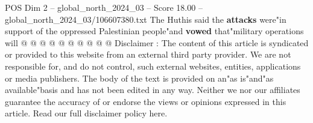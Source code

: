 \begin{textsample}{POS Dim 2 – global\_north\_2024\_03 – Score 18.00 – global\_north\_2024\_03/106607380.txt}
The Huthis said the \textbf{attacks} were"in support of the oppressed Palestinian people"and \textbf{vowed} that"military operations will @ @ @ @ @ @ @ @ @ @ Disclaimer : The content of this article is syndicated or provided to this website from an external third party provider.
We are not responsible for, and do not control, such external websites, entities, applications or media publishers.
The body of the text is provided on an"as is"and"as available"basis and has not been edited in any way.
Neither we nor our affiliates guarantee the accuracy of or endorse the views or opinions expressed in this article.
Read our full disclaimer policy here.

\end{textsample}
